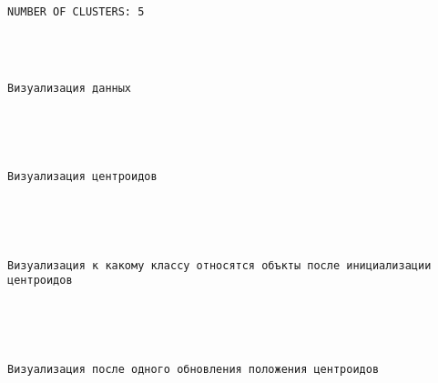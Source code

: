 \documentclass[11pt]{article}
\begin{document}
    \begin{Verbatim}[commandchars=\\\{\}]


NUMBER OF CLUSTERS: 5




Визуализация данных
\end{Verbatim}

    \begin{center}
    \end{center}
    { \hspace*{\fill} \\}
    
    \begin{Verbatim}[commandchars=\\\{\}]


Визуализация центроидов
\end{Verbatim}

    \begin{center}
    \end{center}
    { \hspace*{\fill} \\}
    
    \begin{Verbatim}[commandchars=\\\{\}]


Визуализация к какому классу относятся объкты после инициализации центроидов
\end{Verbatim}

    \begin{center}
    \end{center}
    { \hspace*{\fill} \\}
    
    \begin{Verbatim}[commandchars=\\\{\}]


Визуализация после одного обновления положения центроидов
\end{Verbatim}

    \begin{center}
    \end{center}
    { \hspace*{\fill} \\}
    
\end{document}
